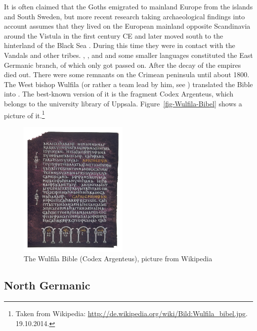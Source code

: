It is often claimed that the Goths emigrated to mainland Europe from the  islands and South
Sweden, but more recent research taking archaeological findings into account assumes that they lived
on the European mainland opposite Scandinavia around the Vistula in the first century CE and later moved south to the hinterland of
the Black Sea \citep[20--30]{Heather1999a-u}. During this time they were in contact with the Vandals and other tribes.
, , and  and some smaller languages constituted the East Germanic branch, of which only  got passed on.
After the decay of the  empires  died out. There were some remnants on the Crimean
peninsula until about 1800. The West  bishop Wulfila (or rather a team lead by him, see
\citealt{Ratkus2018a-u}) translated the Bible into . The
best-known version of it is the fragment Codex Argenteus, which belongs to the university library of
Uppsala. Figure~\vref{fig-Wulfila-Bibel} shows a picture of it.\footnote{
Taken from Wikipedia: \url{http://de.wikipedia.org/wiki/Bild:Wulfila_bibel.jpg}. 19.10.2014.
}
\begin{figure}
\includegraphics[width=53mm]{Pictures/Wulfila_bibel}
\caption{\label{fig-Wulfila-Bibel}The Wulfila Bible (Codex Argenteus), picture from Wikipedia}
\end{figure}


\subsection{North Germanic}

